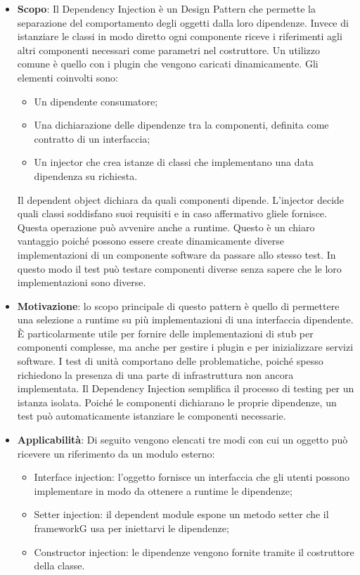		\begin{itemize}
		\item \textbf{Scopo}: Il Dependency Injection è un Design Pattern che permette la separazione del comportamento degli oggetti dalla loro dipendenze. Invece di istanziare le classi in modo diretto ogni componente riceve i riferimenti agli altri componenti necessari come parametri nel costruttore. Un utilizzo comune è quello con i plugin che vengono caricati dinamicamente. Gli elementi coinvolti sono:
\begin{itemize}
\item Un dipendente consumatore;
\item Una dichiarazione delle dipendenze tra la componenti, definita come contratto di un interfaccia;
\item Un injector che crea istanze di classi che implementano una data dipendenza su richiesta.
\end{itemize}
Il dependent object dichiara da quali componenti dipende. L’injector decide quali classi soddisfano suoi requisiti e in caso affermativo gliele fornisce. Questa operazione può avvenire anche a runtime. Questo è un chiaro vantaggio poiché possono essere create dinamicamente diverse implementazioni di un componente software da passare allo stesso test. In questo modo il test può testare componenti diverse senza sapere che le loro implementazioni sono diverse.
\item \textbf{Motivazione}: lo scopo principale di questo pattern è quello di permettere una selezione a runtime su più implementazioni di una interfaccia dipendente. È particolarmente utile per fornire delle implementazioni di stub per componenti complesse, ma anche per gestire i plugin e per inizializzare servizi software. I test di unità comportano delle problematiche, poiché spesso richiedono la presenza di una parte di infrastruttura non ancora implementata. Il Dependency Injection semplifica il processo di testing per un istanza isolata. Poiché le componenti dichiarano le proprie dipendenze, un test può automaticamente istanziare le componenti necessarie.
\item \textbf{Applicabilità}: Di seguito vengono elencati tre modi con cui un oggetto può ricevere un riferimento da un modulo esterno:
\begin{itemize}
\item Interface injection: l’oggetto fornisce un interfaccia che gli utenti possono implementare
in modo da ottenere a runtime le dipendenze;
\item Setter injection: il dependent module espone un metodo setter che il frameworkG usa per
iniettarvi le dipendenze;
\item Constructor injection: le dipendenze vengono fornite tramite il costruttore della classe.
\end{itemize}

		\end{itemize}
